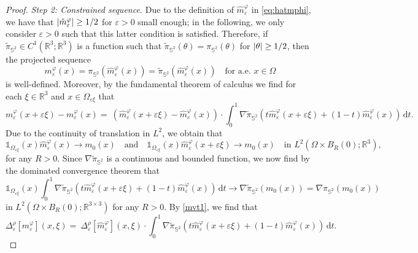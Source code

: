 \documentclass[reqno,11pt]{amsart}
\numberwithin{equation}{section}
\theoremstyle{thmlemcorr}
\numberwithin{theorem}{section}
\theoremstyle{thmlemcorr*}
\theoremstyle{defi}
\theoremstyle{remexample}
\theoremstyle{ass}
\newcommand{\R}{\mathbb{R}}
\renewcommand{\S}{\mathbb{S}}
\renewcommand{\epsilon}{\varepsilon}
\newcommand{\dd}{\,\mathrm{d}}
\DeclarePairedDelimiter{\abs}{\lvert}{\rvert}
\newcommand{\1}{\mathds{1}}
\newcommand{\Om}{\Omega}
\newcommand{\veps}{\varepsilon}
\begin{document}
\begin{proof}

\medskip

\textit{Step 2: Constrained sequence.} Due to the definition of $\hat{m}^{\varphi}_\veps$ in \eqref{eq:hatmphi}, we have that $\abs{\hat{m}^{\varphi}_\veps}\geq 1/2$ for $\epsilon >0$ small enough; in the following, we only consider $\epsilon > 0$ such that this latter condition is satisfied. Therefore, if $\tilde{\pi}_{\S^2} \in C^1(\R^3;\R^3)$ is a function such that $\tilde{\pi}_{\S^2}(\theta) = \pi_{\S^2}(\theta)$ for $\abs{\theta} \geq 1/2$, then the projected sequence 
\[
m_\veps^\varphi(x) = \pi_{\S^2}(\hat{m}^{\varphi}_\veps(x))= \tilde{\pi}_{\S^2}(\hat{m}^{\varphi}_\veps(x)) \quad \text{for a.e.~$x \in \Omega$}
\]
is well-defined.
Moreover, by the fundamental theorem of calculus we find for each $\xi \in \R^3$ and $x \in \Omega_{\epsilon \xi}$ that
\begin{equation}\label{mvt1}
    m^{\varphi}_\veps(x + \veps \xi) - m^{\varphi}_\veps(x) = \   (\hat{m}^{\varphi}_\veps(x + \veps \xi) - \hat{m}^{\varphi}_\veps(x)) \cdot \int_0^1 \nabla \tilde{\pi}_{\S^2}(t\hat{m}^{\varphi}_\epsilon(x+\epsilon \xi) +(1-t) \hat{m}^{\varphi}_\epsilon(x))\dd t .
\end{equation}
Due to the continuity of translation in $L^2$, we obtain that
\[
\mathds{1}_{\Omega_{\epsilon \xi}}(x)\hat{m}^{\varphi}_\epsilon(x) \to m_0(x) \quad \text{and} \quad \mathds{1}_{\Omega_{\epsilon \xi}}(x)\hat{m}^{\varphi}_\veps(x + \veps \xi) \to m_0(x) \quad \text{in $L^2(\Omega\times B_R(0);\R^3)$,}
\]
for any $R>0$. Since $\nabla \tilde{\pi}_{\S^2}$ is a continuous and bounded function, we now find by the dominated convergence theorem that
\begin{equation}\label{segment-converge}
\mathds{1}_{\Omega_{\epsilon \xi}}(x)\int_0^1 \nabla \tilde{\pi}_{\S^2}(t\hat{m}^{\varphi}_\epsilon(x+\epsilon \xi) +(1-t) \hat{m}^{\varphi}_\epsilon(x))\dd t \to \nabla\tilde{\pi}_{\S^2}(m_0(x)) = \nabla \pi_{\S^2}(m_0(x))
\end{equation}
in $L^2(\Omega\times B_R(0);\R^{3\times 3})$ for any $R>0$. By \eqref{mvt1},  we find that
\begin{equation*}
\Delta_\epsilon^\rho[m_\veps^{\varphi}](x,\xi) =  \ \Delta_\epsilon^\rho[\hat{m}^{\varphi}_\veps](x,\xi) \cdot \int_0^1 \nabla \tilde{\pi}_{\S^2}(t\hat{m}^{\varphi}_\epsilon(x+\epsilon \xi) +(1-t) \hat{m}^{\varphi}_\epsilon(x))\dd t.

\end{equation*}
\end{proof}
\end{document}
